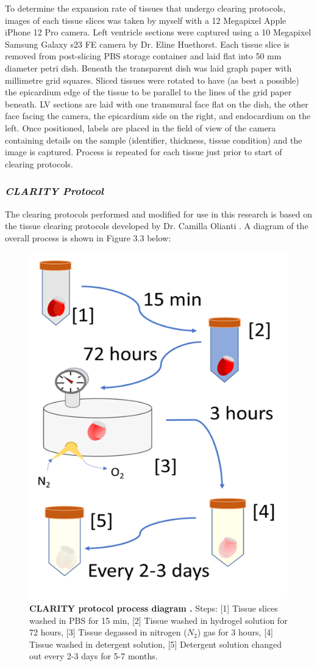 To determine the expansion rate of tissues that undergo clearing protocols,  images of each tissue slices was taken by myself with a 12 Megapixel Apple iPhone 12 Pro camera. Left ventricle sections were captured using a 10 Megapixel Samsung Galaxy s23 FE camera by Dr. Eline Huethorst. Each tissue slice is removed from post-slicing PBS storage container and laid flat into 50 mm diameter petri dish.  Beneath the transparent dish was laid graph paper with millimetre grid squares. Sliced tissues were rotated to have (as best a possible) the epicardium edge of the tissue to be parallel to the lines of the grid paper beneath. LV sections are laid with one transmural face flat on the dish, the other face facing the camera, the epicardium side on the right, and endocardium on the left. Once positioned, labels are placed in the field of view of the camera containing details on the sample (identifier, thickness, tissue condition) and the image is captured. Process is repeated for each tissue just prior to start of clearing protocols. 

\subsubsection{\textit{CLARITY Protocol}}

The clearing protocols performed and modified for use in this research is based on the tissue clearing protocols developed by Dr. Camilla Olianti \cite{olianti_3d_2020, olianti_optical_2021}. A diagram of the overall process is shown in Figure 3.3 below:

\begin{figure}[H]
    \centering
    \includegraphics[width=0.5\linewidth]{Figures/Figure3.1.png}
    \caption{\textbf{CLARITY protocol process diagram \cite{olianti_optical_2021}.} Steps: [1] Tissue slices washed in PBS for 15 min, [2] Tissue washed in hydrogel solution for 72 hours, [3] Tissue degassed in nitrogen ($N_2$) gas for 3 hours, [4] Tissue washed in detergent solution, [5] Detergent solution changed out every 2-3 days for 5-7 months.}
    \label{fig:enter-label}
\end{figure}


